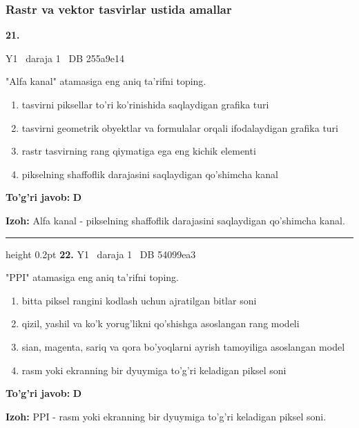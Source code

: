 \documentclass[10pt,a4paper,oneside]{article}
\begin{document}
\subsubsection{Rastr va vektor tasvirlar ustida amallar}
\hypertarget{q21}{\textbf{\color{ink}21.}}  {\color{muted}\scriptsize Y1 \textbullet\ daraja 1 \textbullet\ DB 255a9e14}
\par
"Alfa kanal" atamasiga eng aniq ta'rifni toping.
\begin{enumerate}[label=\Alph*),leftmargin=9mm]
\item tasvirni piksellar to'ri ko'rinishida saqlaydigan grafika turi
\item tasvirni geometrik obyektlar va formulalar orqali ifodalaydigan grafika turi
\item rastr tasvirning rang qiymatiga ega eng kichik elementi
\item pikselning shaffoflik darajasini saqlaydigan qo'shimcha kanal
\end{enumerate}
\begin{tcolorbox}[enhanced,breakable,colback=teal!4,colframe=teal!45!black,boxrule=0.45pt,arc=1.2mm,left=2.8mm,right=2.8mm,top=2mm,bottom=2mm,before skip=2mm,after skip=2mm]
\textbf{\color{teal}To'g'ri javob:} \textbf{D}
\par\smallskip
\textbf{Izoh:} Alfa kanal - pikselning shaffoflik darajasini saqlaydigan qo'shimcha kanal.
\end{tcolorbox}
\vspace{2mm}\hrule height 0.2pt \vspace{4mm}
\hypertarget{q22}{\textbf{\color{ink}22.}}  {\color{muted}\scriptsize Y1 \textbullet\ daraja 1 \textbullet\ DB 54099ea3}
\par
"PPI" atamasiga eng aniq ta'rifni toping.
\begin{enumerate}[label=\Alph*),leftmargin=9mm]
\item bitta piksel rangini kodlash uchun ajratilgan bitlar soni
\item qizil, yashil va ko'k yorug'likni qo'shishga asoslangan rang modeli
\item sian, magenta, sariq va qora bo'yoqlarni ayrish tamoyiliga asoslangan model
\item rasm yoki ekranning bir dyuymiga to'g'ri keladigan piksel soni
\end{enumerate}
\begin{tcolorbox}[enhanced,breakable,colback=teal!4,colframe=teal!45!black,boxrule=0.45pt,arc=1.2mm,left=2.8mm,right=2.8mm,top=2mm,bottom=2mm,before skip=2mm,after skip=2mm]
\textbf{\color{teal}To'g'ri javob:} \textbf{D}
\par\smallskip
\textbf{Izoh:} PPI - rasm yoki ekranning bir dyuymiga to'g'ri keladigan piksel soni.
\end{tcolorbox}
\end{document}
